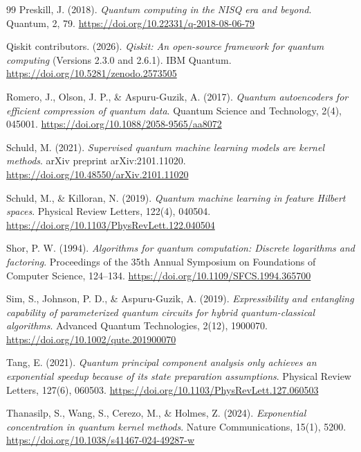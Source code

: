 \begin{thebibliography}{99}
	Preskill, J. (2018).
	\emph{Quantum computing in the NISQ era and beyond}.
	Quantum, 2, 79.
	\url{https://doi.org/10.22331/q-2018-08-06-79}

	Qiskit contributors. (2026).
	\emph{Qiskit: An open-source framework for quantum computing} (Versions 2.3.0 and 2.6.1).
	IBM Quantum.
	\url{https://doi.org/10.5281/zenodo.2573505}

	Romero, J., Olson, J. P., \& Aspuru-Guzik, A. (2017).
	\emph{Quantum autoencoders for efficient compression of quantum data}.
	Quantum Science and Technology, 2(4), 045001.
	\url{https://doi.org/10.1088/2058-9565/aa8072}

	Schuld, M. (2021).
	\emph{Supervised quantum machine learning models are kernel methods}.
	arXiv preprint arXiv:2101.11020.
	\url{https://doi.org/10.48550/arXiv.2101.11020}

	Schuld, M., \& Killoran, N. (2019).
	\emph{Quantum machine learning in feature Hilbert spaces}.
	Physical Review Letters, 122(4), 040504.
	\url{https://doi.org/10.1103/PhysRevLett.122.040504}

	Shor, P. W. (1994).
	\emph{Algorithms for quantum computation: Discrete logarithms and factoring}.
	Proceedings of the 35th Annual Symposium on Foundations of Computer Science, 124--134.
	\url{https://doi.org/10.1109/SFCS.1994.365700}

	Sim, S., Johnson, P. D., \& Aspuru-Guzik, A. (2019).
	\emph{Expressibility and entangling capability of parameterized quantum circuits for hybrid quantum-classical algorithms}.
	Advanced Quantum Technologies, 2(12), 1900070.
	\url{https://doi.org/10.1002/qute.201900070}

	Tang, E. (2021).
	\emph{Quantum principal component analysis only achieves an exponential speedup because of its state preparation assumptions}.
	Physical Review Letters, 127(6), 060503.
	\url{https://doi.org/10.1103/PhysRevLett.127.060503}

	Thanasilp, S., Wang, S., Cerezo, M., \& Holmes, Z. (2024).
	\emph{Exponential concentration in quantum kernel methods}.
	Nature Communications, 15(1), 5200.
	\url{https://doi.org/10.1038/s41467-024-49287-w}


\end{thebibliography}
